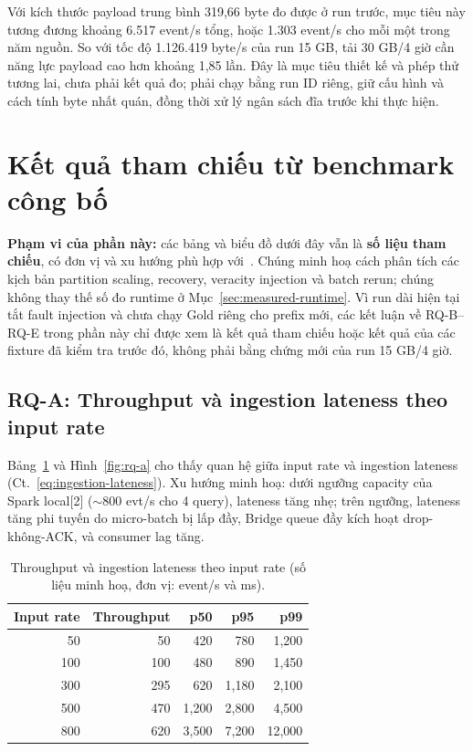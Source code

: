 Với kích thước payload trung bình 319,66 byte đo được ở run trước, mục tiêu
này tương đương khoảng 6.517 event/s tổng, hoặc 1.303 event/s cho mỗi một
trong năm nguồn. So với tốc độ 1.126.419 byte/s của run 15 GB, tải 30 GB/4
giờ cần năng lực payload cao hơn khoảng 1,85 lần. Đây là mục tiêu thiết kế
và phép thử tương lai, chưa phải kết quả đo; phải chạy bằng run ID riêng,
giữ cấu hình và cách tính byte nhất quán, đồng thời xử lý ngân sách đĩa
trước khi thực hiện.

\section{Kết quả tham chiếu từ benchmark công bố}

\textbf{Phạm vi của phần này:} các bảng và biểu đồ dưới đây vẫn là \textbf{số
liệu tham chiếu}, có đơn vị và xu hướng phù hợp với~\cite{kafka_patterns_benchmark_2025,
shufflebench_2024, fault_recovery_stream_2024, confluent_partition_count}.
Chúng minh hoạ cách phân tích các kịch bản partition scaling, recovery,
veracity injection và batch rerun; chúng không thay thế số đo runtime ở
Mục~\ref{sec:measured-runtime}. Vì run dài hiện tại tắt fault injection và
chưa chạy Gold riêng cho prefix mới, các kết luận về RQ-B--RQ-E trong phần
này chỉ được xem là kết quả tham chiếu hoặc kết quả của các fixture đã kiểm
tra trước đó, không phải bằng chứng mới của run 15 GB/4 giờ.

\subsection{RQ-A: Throughput và ingestion lateness theo input rate}

Bảng~\ref{tab:rq-a} và Hình~\ref{fig:rq-a} cho thấy quan hệ giữa input
rate và ingestion lateness (Ct.~\ref{eq:ingestion-lateness}). Xu hướng minh
hoạ: dưới ngưỡng capacity của Spark local{[}2{]} ($\sim$800 evt/s cho 4
query), lateness tăng nhẹ; trên ngưỡng, lateness tăng phi tuyến do
micro-batch bị lấp đầy, Bridge queue đầy kích hoạt drop-không-ACK, và
consumer lag tăng.

\begin{table}[H]
\centering
\caption{Throughput và ingestion lateness theo input rate (số liệu minh hoạ, đơn vị: event/s và ms).}
\label{tab:rq-a}
\begin{tabular}{rrrrr}
\toprule
\textbf{Input rate} & \textbf{Throughput} & \textbf{p50} & \textbf{p95} & \textbf{p99} \\
\midrule
50   & 50   & 420  & 780  & 1,200 \\
100  & 100  & 480  & 890  & 1,450 \\
300  & 295  & 620  & 1,180 & 2,100 \\
500  & 470  & 1,200 & 2,800 & 4,500 \\
800  & 620  & 3,500 & 7,200 & 12,000 \\
\bottomrule
\end{tabular}
\end{table}

